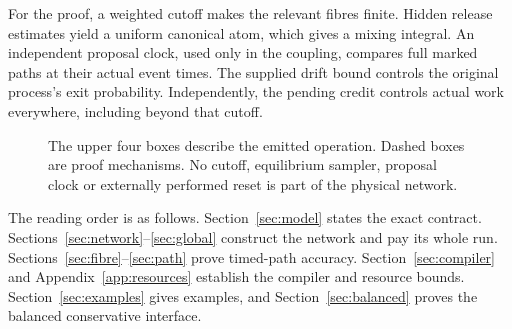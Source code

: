 \documentclass[11pt,reqno]{amsart}
\theoremstyle{definition}
\theoremstyle{remark}
\begin{document}
For the proof, a weighted cutoff makes the relevant fibres finite. Hidden
release estimates yield a uniform canonical atom, which gives a mixing
integral. An independent proposal clock, used only in the coupling, compares
full marked paths at their actual event times. The supplied drift bound controls
the original process's exit probability. Independently, the pending credit
controls actual work everywhere, including beyond that cutoff.

\begin{figure}[tb]
\centering
{}
\caption{The upper four boxes describe the emitted operation. Dashed boxes
are proof mechanisms. No cutoff, equilibrium sampler, proposal clock or
externally performed reset is part of the physical network.}
\label{fig:pipeline}
\end{figure}

The reading order is as follows. Section~\ref{sec:model} states the exact
contract. Sections~\ref{sec:network}--\ref{sec:global} construct the network and
pay its whole run. Sections~\ref{sec:fibre}--\ref{sec:path} prove timed-path
accuracy. Section~\ref{sec:compiler} and Appendix~\ref{app:resources} establish
the compiler and resource bounds. Section~\ref{sec:examples} gives examples,
and Section~\ref{sec:balanced} proves the balanced conservative interface.
\end{document}
